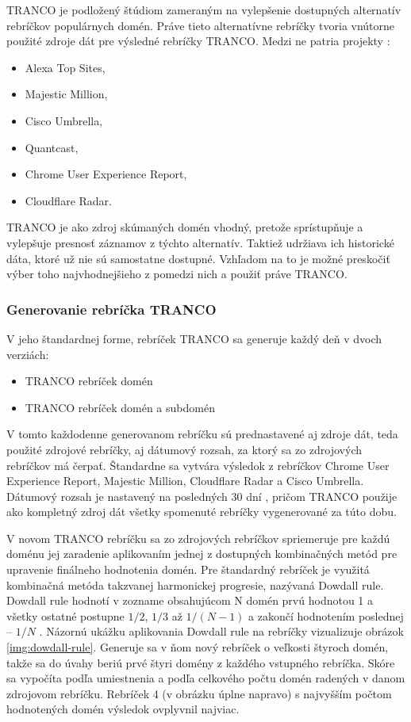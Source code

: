 TRANCO je podložený štúdiom zameraným na vylepšenie dostupných alternatív rebríčkov populárnych domén.
Práve tieto alternatívne rebríčky tvoria vnútorne použité zdroje dát pre výsledné rebríčky TRANCO.
Medzi ne patria projekty \cite{tranco-config}:
\begin{itemize}
    \item Alexa Top Sites,
    \item Majestic Million,
    \item Cisco Umbrella,
    \item Quantcast,
    \item Chrome User Experience Report,
    \item Cloudflare Radar.
\end{itemize}
TRANCO je ako zdroj skúmaných domén vhodný, pretože sprístupňuje a vylepšuje presnosť záznamov z týchto alternatív.
Taktiež udržiava ich historické dáta, ktoré už nie sú samostatne dostupné.
Vzhľadom na to je možné preskočiť výber toho najvhodnejšieho z pomedzi nich a použiť práve TRANCO.

\pagebreak

\subsubsection{Generovanie rebríčka TRANCO}
\label{tranco-generation}

V jeho štandardnej forme, rebríček TRANCO sa generuje každý deň v dvoch verziách:
\begin{itemize}
    \item TRANCO rebríček domén
    \item TRANCO rebríček domén a subdomén
\end{itemize}

V tomto každodenne generovanom rebríčku sú prednastavené aj zdroje dát, teda použité zdrojové rebríčky, aj dátumový rozsah, za ktorý sa zo zdrojových rebríčkov má čerpať.
Štandardne sa vytvára výsledok z rebríčkov Chrome User Experience Report, Majestic Million, Cloudflare Radar a Cisco Umbrella.
Dátumový rozsah je nastavený na posledných 30 dní \cite{tranco-config}, pričom TRANCO použije ako kompletný zdroj dát všetky spomenuté rebríčky vygenerované za túto dobu. 

V novom TRANCO rebríčku sa zo zdrojových rebríčkov spriemeruje pre každú doménu jej zaradenie aplikovaním jednej z dostupných kombinačných metód pre upravenie finálneho hodnotenia domén.
Pre štandardný rebríček je využitá kombinačná metóda takzvanej harmonickej progresie, nazývaná Dowdall rule. 
Dowdall rule hodnotí v zozname obsahujúcom N domén prvú hodnotou 1 a všetky ostatné postupne \(1/2\), \(1/3\) až \(1/(N-1)\) a zakončí hodnotením poslednej -- \(1/N\) \cite{tranco, tranco-config}.
Názornú ukážku aplikovania Dowdall rule na rebríčky vizualizuje obrázok \ref{img:dowdall-rule}.
Generuje sa v ňom nový rebríček o veľkosti štyroch domén, takže sa do úvahy beriú prvé štyri domény z každého vstupného rebríčka. 
Skóre sa vypočíta podľa umiestnenia a podľa celkového počtu domén radených v danom zdrojovom rebríčku. 
Rebríček 4 (v obrázku úplne napravo) s najvyšším počtom hodnotených domén výsledok ovplyvnil najviac.

